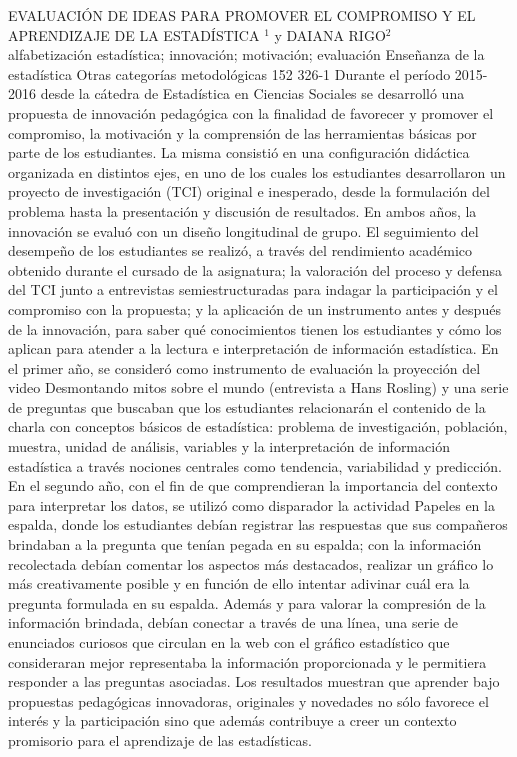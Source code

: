 \A
{EVALUACIÓN DE IDEAS PARA PROMOVER EL COMPROMISO Y EL APRENDIZAJE DE LA ESTADÍSTICA}
{$^1$ y DAIANA RIGO$^2$}
{
\\}
{alfabetización estadística; innovación; motivación; evaluación} 
 {Enseñanza de la estadística} 
 {Otras categorías metodológicas} 
 {152} 
 {326-1}
{Durante el período 2015-2016 desde la cátedra de Estadística en Ciencias Sociales se desarrolló una propuesta de innovación pedagógica con la finalidad de favorecer y promover el compromiso, la motivación y la comprensión de las herramientas básicas por parte de los estudiantes. La misma consistió en una configuración didáctica organizada en distintos ejes, en uno de los cuales los estudiantes desarrollaron un proyecto de investigación (TCI) original e inesperado, desde la formulación del problema hasta la presentación y discusión de resultados. En ambos años, la innovación se evaluó con un diseño longitudinal de grupo. El seguimiento del desempeño de los estudiantes se realizó, a través del rendimiento académico obtenido durante el cursado de la asignatura; la valoración del proceso y defensa del TCI junto a entrevistas semiestructuradas para indagar la participación y el compromiso con la propuesta; y la aplicación de un instrumento antes y después de la innovación, para saber qué conocimientos tienen los estudiantes y cómo los aplican para atender a la lectura e interpretación de información estadística. En el primer año, se consideró como instrumento de evaluación la proyección del video Desmontando mitos sobre el mundo (entrevista a Hans Rosling) y una serie de preguntas que buscaban que los estudiantes relacionarán el contenido de la charla con conceptos básicos de estadística: problema de investigación, población, muestra, unidad de análisis, variables y la interpretación de información estadística a través nociones centrales como tendencia, variabilidad y predicción. En el segundo año, con el fin de que comprendieran la importancia del contexto para interpretar los datos, se utilizó como disparador la actividad Papeles en la espalda, donde los estudiantes debían registrar las respuestas que sus compañeros brindaban a la pregunta que tenían pegada en su espalda; con la información recolectada debían comentar los aspectos más destacados, realizar un gráfico lo más creativamente posible y en función de ello intentar adivinar cuál era la pregunta formulada en su espalda. Además y para valorar la compresión de la información brindada, debían conectar a través de una línea, una serie de enunciados curiosos que circulan en la web con el gráfico estadístico que consideraran mejor representaba la información proporcionada y le permitiera responder a las preguntas asociadas. Los resultados muestran que aprender bajo propuestas pedagógicas innovadoras, originales y novedades no sólo favorece el interés y la participación sino que además contribuye a creer un contexto promisorio para el aprendizaje de las estadísticas.}
